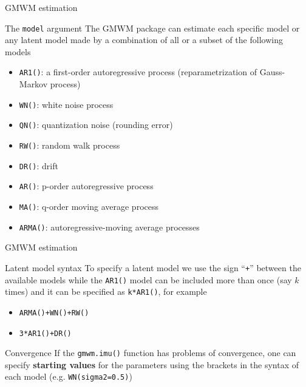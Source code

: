 \documentclass[envcountsect,usenames,dvipsnames]{beamer}
\theoremstyle{mystyle}
\begin{document}
\begin{frame}{GMWM estimation}

\begin{block}{The {\tt model} argument}
The GMWM package can estimate each specific model or any latent model made by a combination of all or a subset of the following models

\begin{itemize}
    \item {\tt AR1()}: a first-order autoregressive process (reparametrization of Gauss-Markov process)
    \item {\tt WN()}: white noise process
    \item {\tt QN()}: quantization noise (rounding error)
    \item {\tt RW()}: random walk process
    \item {\tt DR()}: drift
    \item {\tt AR()}: p-order autoregressive process
    \item {\tt MA()}: q-order moving average process
    \item {\tt ARMA()}: autoregressive-moving average processes
\end{itemize}

\end{block}

\end{frame}



\begin{frame}{GMWM estimation}

\begin{block}{Latent model syntax}
To specify a latent model we use the sign ``{\tt +}'' between the available models while the {\tt AR1()} model can be included more than once (say $k$ times) and it can be specified as {\tt k*AR1()}, for example
\begin{itemize}
    \item {\tt ARMA()+WN()+RW()}
    \item {\tt 3*AR1()+DR()}
\end{itemize}
\end{block}

\begin{alertblock}{Convergence}
If the {\tt gmwm.imu()} function has problems of convergence, one can specify \textbf{starting values} for the parameters using the brackets in the syntax of each model (e.g. {\tt WN(sigma2=0.5)})
\end{alertblock}

\end{frame}
\end{document}
